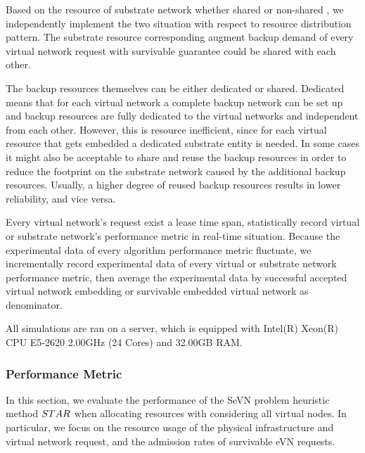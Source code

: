 Based on the resource of substrate network whether shared or non-shared \cite{lu2006efficient}, we independently implement the two situation with respect to resource distribution pattern. The substrate resource corresponding augment backup demand of  every virtual network request with survivable guarantee  could be shared with each other.

The backup resources themselves can be either dedicated or shared\cite{guo2011shared}. Dedicated means that for each virtual network a
complete backup network can be set up and backup resources are fully dedicated to the virtual networks and independent from each other. However, this is resource inefficient, since for each virtual resource that gets embedded a dedicated substrate entity is needed. In some cases it might also be acceptable to share and reuse the backup resources in order to reduce the footprint on the substrate network caused by the additional
backup resources. Usually, a higher degree of reused backup resources results in lower reliability, and vice versa.

Every virtual network's request exist a lease time span, statistically record virtual or substrate network's performance metric in real-time situation. Because the experimental data of every algorithm performance metric fluctuate, we incrementally record experimental data of every virtual or substrate network performance metric, then average the experimental data by successful accepted virtual network embedding or survivable embedded virtual network  as denominator.


All simulations are ran on a server, which is equipped with Intel(R) Xeon(R) CPU E5-2620 2.00GHz (24 Cores) and 32.00GB RAM.


\subsubsection{Performance Metric}
In this section, we evaluate the performance of the SeVN problem heuristic method $STAR$ when allocating resources with considering all virtual nodes. In particular, we focus on the resource usage of the physical infrastructure and virtual network request, and the admission rates of survivable eVN  requests.



